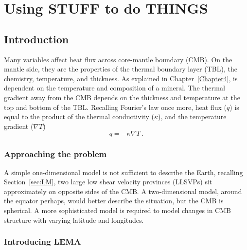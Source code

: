 
\chapter{Using STUFF to do THINGS} %

\label{Chapter5} %

\section{Introduction}

Many variables affect heat flux across core-mantle boundary (CMB). On the mantle side, they are the properties of the thermal boundary layer (TBL), the chemistry, temperature, and thickness. As explained in Chapter~\ref{Chapter4}, \tcs is dependent on the temperature and composition of a mineral. The thermal gradient away from the CMB depends on the thickness and temperature at the top and bottom of the TBL. Recalling Fourier's law once more, heat flux ($q$) is equal to the product of the thermal conductivity ($\kappa$), and the temperature gradient ($\nabla{T}$)
%
\begin{equation}
q=-\kappa \nabla{T}\ . 
\label{eq:fourier5}
\end{equation}

\subsection{Approaching the problem}

A simple one-dimensional model is not sufficient to describe the Earth, recalling Section~\ref{sec:LM}, two large low shear velocity provinces (LLSVPs) sit approximately on opposite sides of the CMB. A two-dimensional model, around the equator perhaps, would better describe the situation, but the CMB is spherical. A more sophisticated model is required to model changes in CMB structure with varying latitude and longitudes.

\subsection{Introducing LEMA}

